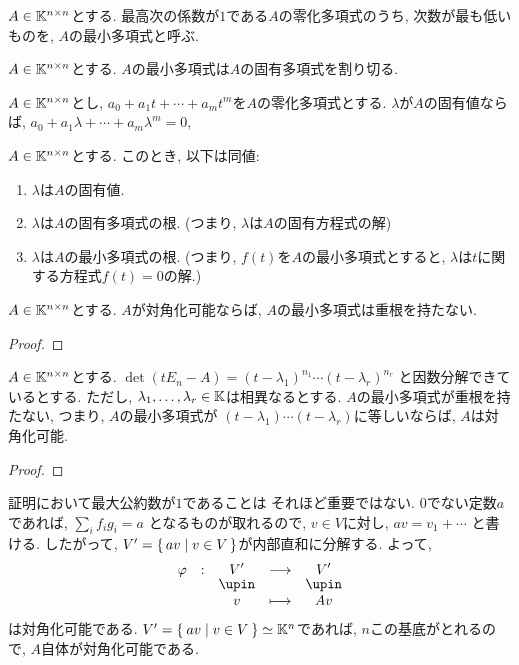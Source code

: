\begin{definition}
$A\in\mathbb{K}^{n\times n}$とする.
最高次の係数が$1$である$A$の零化多項式のうち, 
次数が最も低いものを,
$A$の最小多項式と呼ぶ.
\end{definition}

\begin{cor}
$A\in\mathbb{K}^{n\times n}$とする.
$A$の最小多項式は$A$の固有多項式を割り切る.
\end{cor}
\begin{prop}
$A\in\mathbb{K}^{n\times n}$とし,
$a_0+a_1t+\cdots+a_mt^m$を$A$の零化多項式とする.
$\lambda$が$A$の固有値ならば,
$a_0+a_1\lambda+\cdots+a_m\lambda^m=0$,
\end{prop}
\begin{cor}
$A\in\mathbb{K}^{n\times n}$とする.
このとき, 以下は同値:
\begin{enumerate}
\item $\lambda$は$A$の固有値.
\item $\lambda$は$A$の固有多項式の根.
(つまり, $\lambda$は$A$の固有方程式の解)
\item $\lambda$は$A$の最小多項式の根.
(つまり, $f(t)$を$A$の最小多項式とすると,
$\lambda$は$t$に関する方程式$f(t)=0$の解.)
\end{enumerate}
\end{cor}

\begin{prop}
$A\in\mathbb{K}^{n\times n}$とする.
$A$が対角化可能ならば,
$A$の最小多項式は重根を持たない.
\end{prop}
\begin{proof}\end{proof}

\begin{prop}
$A\in\mathbb{K}^{n\times n}$とする.
$\det(tE_n-A)=(t-\lambda_1)^{n_1}\cdots(t-\lambda_r)^{n_r}$
と因数分解できているとする.
ただし, $\lambda_1,\ldots,\lambda_r\in\mathbb{K}$は相異なるとする.
$A$の最小多項式が重根を持たない,
つまり,
$A$の最小多項式が
$(t-\lambda_1)\cdots(t-\lambda_r)$に等しいならば,
$A$は対角化可能.
\end{prop}
\begin{proof}\end{proof}
\begin{note}
証明において最大公約数が$1$であることは
それほど重要ではない.
$0$でない定数$a$であれば,
$\sum_{i}f_ig_i=a$
となるものが取れるので,
$v\in V$に対し,
$av=v_1+\cdots$
と書ける.
したがって,
$V'=\set{a v|v\in V}$が内部直和に分解する.
よって,
\begin{align*}
\shazo{\varphi}{V'}{V'}
{v}{Av}
\end{align*}
は対角化可能である.
$V'=\Set{av|v\in V}\simeq \mathbb{K}^n$であれば,
$n$この基底がとれるので,
$A$自体が対角化可能である.
\end{note}

